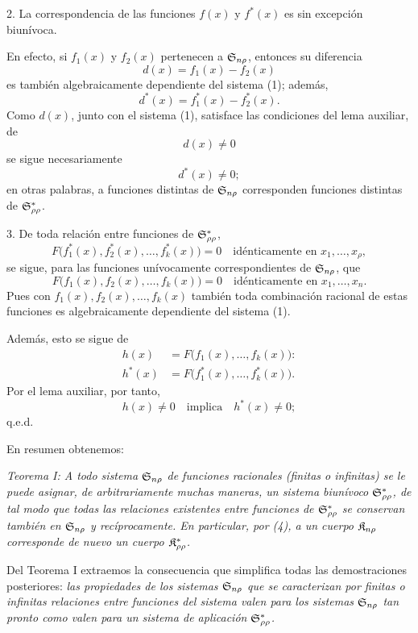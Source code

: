 \documentclass[11pt]{article}
\begin{document}
2. La correspondencia de las funciones $f(x)$ y $f^*(x)$ es sin excepción biunívoca.

En efecto, si $f_1(x)$ y $f_2(x)$ pertenecen a $\mathfrak{S}_{n\rho}$, entonces su diferencia
\[
  d(x)=f_1(x)-f_2(x)
\]
es también algebraicamente dependiente del sistema (1); además,
\[
  d^*(x)=f_1^*(x)-f_2^*(x).
\]
Como $d(x)$, junto con el sistema (1), satisface las condiciones del lema auxiliar, de
\[
  d(x)\ne0
\]
se sigue necesariamente
\[
  d^*(x)\ne0;
\]
en otras palabras, a funciones distintas de $\mathfrak{S}_{n\rho}$ corresponden funciones distintas de $\mathfrak{S}^*_{\rho\rho}$.

3. De toda relación entre funciones de $\mathfrak{S}^*_{\rho\rho}$,
\[
  F\bigl(f_1^*(x),f_2^*(x),\ldots,f_k^*(x)\bigr)=0
  \quad\text{idénticamente en }x_1,\ldots,x_\rho,
\]
se sigue, para las funciones unívocamente correspondientes de $\mathfrak{S}_{n\rho}$, que
\[
  F\bigl(f_1(x),f_2(x),\ldots,f_k(x)\bigr)=0
  \quad\text{idénticamente en }x_1,\ldots,x_n.
\]
Pues con $f_1(x),f_2(x),\ldots,f_k(x)$ también toda combinación racional de estas funciones es algebraicamente dependiente del sistema (1).

Además, esto se sigue de
\begin{equation}
\begin{aligned}
 h(x)&=F\bigl(f_1(x),\ldots,f_k(x)\bigr):\\
 h^*(x)&=F\bigl(f_1^*(x),\ldots,f_k^*(x)\bigr).
\end{aligned}
\tag{4}
\end{equation}
Por el lema auxiliar, por tanto,
\[
  h(x)\ne0\quad\text{implica}\quad h^*(x)\ne0;
\]
q.e.d.

En resumen obtenemos:

\emph{Teorema I: A todo sistema $\mathfrak{S}_{n\rho}$ de funciones racionales (finitas o infinitas) se le puede asignar, de arbitrariamente muchas maneras, un sistema biunívoco $\mathfrak{S}^*_{\rho\rho}$, de tal modo que todas las relaciones existentes entre funciones de $\mathfrak{S}^*_{\rho\rho}$ se conservan también en $\mathfrak{S}_{n\rho}$ y recíprocamente. En particular, por (4), a un cuerpo $\mathfrak{K}_{n\rho}$ corresponde de nuevo un cuerpo $\mathfrak{K}^*_{\rho\rho}$.}

Del Teorema I extraemos la consecuencia que simplifica todas las demostraciones posteriores: \emph{las propiedades de los sistemas $\mathfrak{S}_{n\rho}$ que se caracterizan por finitas o infinitas relaciones entre funciones del sistema valen para los sistemas $\mathfrak{S}_{n\rho}$ tan pronto como valen para un sistema de aplicación $\mathfrak{S}^*_{\rho\rho}$.}
\end{document}
